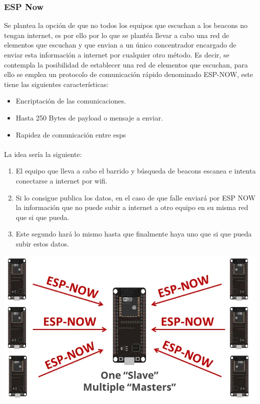 \documentclass[a4paper ,12pt, onecolumn]{article}
\begin{document}
\begin{enumerate}
        \subsubsection {ESP Now}
            Se plantea la opción de que no todos los equipos que escuchan a los beacons no tengan internet, es por ello por lo 
            que se plantéa llevar a cabo una red de elementos que escuchan y que envian a un único concentrador encargado de enviar
            esta información a internet por cualquier otro método.
            Es decir, se contempla la posibilidad de establecer una red de elementos que escuchan, para ello se emplea 
            un protocolo de comunicación rápido denominado ESP-NOW, este tiene las siguientes características:
            \begin{itemize}
                \item Encriptación de las comunicaciones.
                \item Hasta 250 Bytes de payload o mensaje a enviar.
                \item Rapidez de comunicación entre esps
            \end{itemize}
            \paragraph{}
            La idea sería la siguiente:
            \begin{enumerate}
                \item El equipo que lleva a cabo el barrido y búsqueda de beacons escanea e intenta conectarse a 
                internet por wifi.
                \item Si lo consigue publica los datos, en el caso de que falle enviará por ESP NOW la información
                que no puede subir a internet a otro equipo en su misma red que si que pueda.
                \item Este segundo hará lo mismo hasta que finalmente haya uno que si que pueda subir estos datos.
            \end{enumerate}
            \begin{center}
                \includegraphics[scale=0.4]{espnow.png}
            \end{center}
        \end{enumerate}
\end{document}
